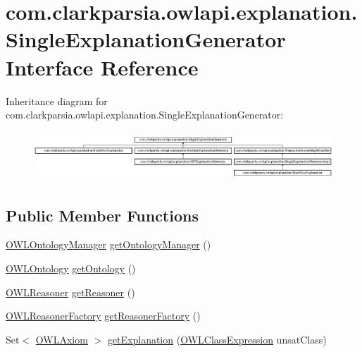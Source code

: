 \hypertarget{interfacecom_1_1clarkparsia_1_1owlapi_1_1explanation_1_1_single_explanation_generator}{\section{com.\-clarkparsia.\-owlapi.\-explanation.\-Single\-Explanation\-Generator Interface Reference}
\label{interfacecom_1_1clarkparsia_1_1owlapi_1_1explanation_1_1_single_explanation_generator}
}
Inheritance diagram for com.\-clarkparsia.\-owlapi.\-explanation.\-Single\-Explanation\-Generator\-:\begin{figure}[H]
\begin{center}
\leavevmode
\includegraphics[height=1.848185cm]{interfacecom_1_1clarkparsia_1_1owlapi_1_1explanation_1_1_single_explanation_generator}
\end{center}
\end{figure}
\subsection*{Public Member Functions}
\begin{DoxyCompactItemize}
\item 
\hyperlink{interfaceorg_1_1semanticweb_1_1owlapi_1_1model_1_1_o_w_l_ontology_manager}{O\-W\-L\-Ontology\-Manager} \hyperlink{interfacecom_1_1clarkparsia_1_1owlapi_1_1explanation_1_1_single_explanation_generator_a6a0bc863be0d37cdf6bb6f1a310c2702}{get\-Ontology\-Manager} ()
\item 
\hyperlink{interfaceorg_1_1semanticweb_1_1owlapi_1_1model_1_1_o_w_l_ontology}{O\-W\-L\-Ontology} \hyperlink{interfacecom_1_1clarkparsia_1_1owlapi_1_1explanation_1_1_single_explanation_generator_aa96cdb99bc3118ac79aca687eccb9000}{get\-Ontology} ()
\item 
\hyperlink{interfaceorg_1_1semanticweb_1_1owlapi_1_1reasoner_1_1_o_w_l_reasoner}{O\-W\-L\-Reasoner} \hyperlink{interfacecom_1_1clarkparsia_1_1owlapi_1_1explanation_1_1_single_explanation_generator_ae8770f4cba7f2222dfe6bbce2bcbc1e1}{get\-Reasoner} ()
\item 
\hyperlink{interfaceorg_1_1semanticweb_1_1owlapi_1_1reasoner_1_1_o_w_l_reasoner_factory}{O\-W\-L\-Reasoner\-Factory} \hyperlink{interfacecom_1_1clarkparsia_1_1owlapi_1_1explanation_1_1_single_explanation_generator_a58adb5aadcb57d6098b5735c582bfcf1}{get\-Reasoner\-Factory} ()
\item 
Set$<$ \hyperlink{interfaceorg_1_1semanticweb_1_1owlapi_1_1model_1_1_o_w_l_axiom}{O\-W\-L\-Axiom} $>$ \hyperlink{interfacecom_1_1clarkparsia_1_1owlapi_1_1explanation_1_1_single_explanation_generator_a830a20b5e3d896ab49d20c02ce74c3d0}{get\-Explanation} (\hyperlink{interfaceorg_1_1semanticweb_1_1owlapi_1_1model_1_1_o_w_l_class_expression}{O\-W\-L\-Class\-Expression} unsat\-Class)
\end{DoxyCompactItemize}


